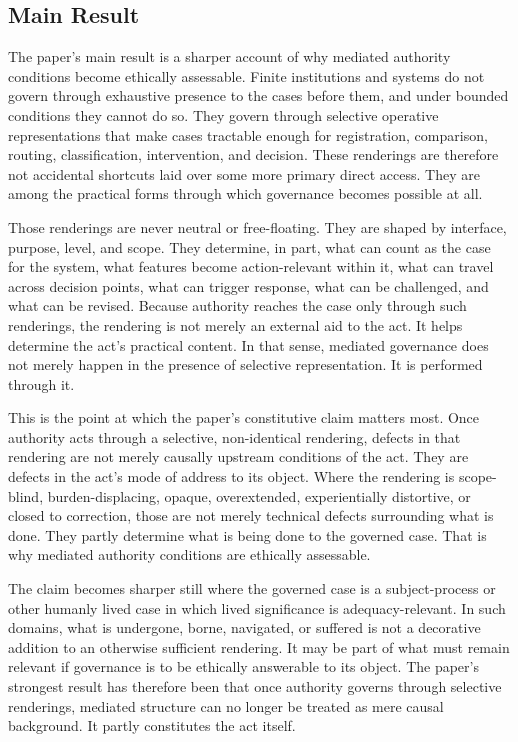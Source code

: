 \documentclass[11pt]{article}
\begin{document}
\subsection{Main Result}

The paper's main result is a sharper account of why mediated authority conditions become ethically assessable. Finite institutions and systems do not govern through exhaustive presence to the cases before them, and under bounded conditions they cannot do so. They govern through selective operative representations that make cases tractable enough for registration, comparison, routing, classification, intervention, and decision. These renderings are therefore not accidental shortcuts laid over some more primary direct access. They are among the practical forms through which governance becomes possible at all.

Those renderings are never neutral or free-floating. They are shaped by interface, purpose, level, and scope. They determine, in part, what can count as the case for the system, what features become action-relevant within it, what can travel across decision points, what can trigger response, what can be challenged, and what can be revised. Because authority reaches the case only through such renderings, the rendering is not merely an external aid to the act. It helps determine the act's practical content. In that sense, mediated governance does not merely happen in the presence of selective representation. It is performed through it.

This is the point at which the paper's constitutive claim matters most. Once authority acts through a selective, non-identical rendering, defects in that rendering are not merely causally upstream conditions of the act. They are defects in the act's mode of address to its object. Where the rendering is scope-blind, burden-displacing, opaque, overextended, experientially distortive, or closed to correction, those are not merely technical defects surrounding what is done. They partly determine what is being done to the governed case. That is why mediated authority conditions are ethically assessable.

The claim becomes sharper still where the governed case is a subject-process or other humanly lived case in which lived significance is adequacy-relevant. In such domains, what is undergone, borne, navigated, or suffered is not a decorative addition to an otherwise sufficient rendering. It may be part of what must remain relevant if governance is to be ethically answerable to its object. The paper's strongest result has therefore been that once authority governs through selective renderings, mediated structure can no longer be treated as mere causal background. It partly constitutes the act itself.
\end{document}
